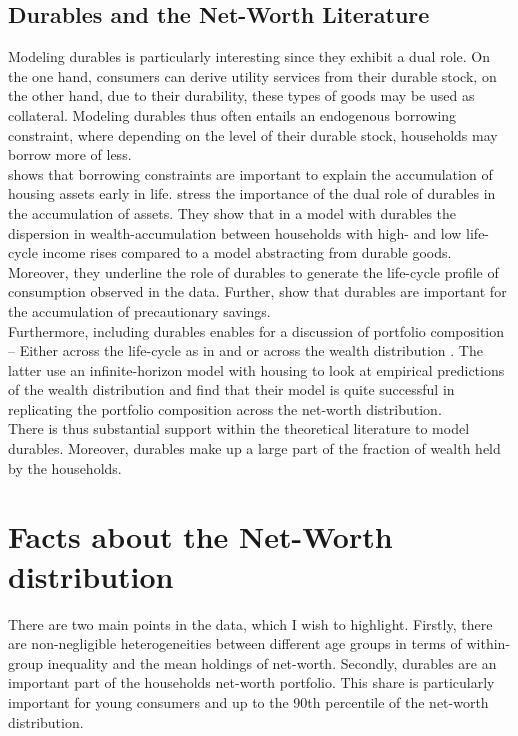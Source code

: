 \documentclass[a4paper,12pt,legno]{article}
\begin{document}
\subsection{Durables and the Net-Worth Literature}

Modeling durables is particularly interesting since they exhibit a dual role. On the one hand, consumers can derive utility services from their durable stock, on the other hand, due to their durability, these types of goods may be used as collateral. Modeling durables thus often entails an endogenous borrowing constraint, where depending on the level of their durable stock, households may borrow more of less. \\
\cite{yang2009} shows that borrowing constraints are important to explain the accumulation of housing assets early in life. \cite{FV&K2011} stress the importance of the dual role of durables in the accumulation of assets. They show that in a model with durables the dispersion in wealth-accumulation between households with high- and low life-cycle income rises compared to a model abstracting from durable goods. Moreover, they underline the role of durables to generate the life-cycle profile of consumption observed in the data. Further, \cite{gruber2003precautionary} show that durables are important for the accumulation of precautionary savings.    
\\
Furthermore, including durables enables for a discussion of portfolio composition \--- Either across the life-cycle as in \cite{yang2009} and \cite{FV&K2011} or across the wealth distribution \citep{diaz2010}. The latter use an infinite-horizon model with housing to look at empirical predictions of the wealth distribution and find that their model is quite successful in replicating the portfolio composition across the net-worth distribution.
\\
There is thus substantial support within the theoretical literature to model durables. Moreover, durables make up a large part of the fraction of wealth held by the households. 

\section{Facts about the Net-Worth distribution } There are two main points in the data, which I wish to highlight. Firstly, there are non-negligible heterogeneities between different age groups in terms of within-group inequality and the mean holdings of net-worth. Secondly, durables are an important part of the households net-worth portfolio. This share is particularly important for young consumers and up to the 90th percentile of the net-worth distribution. 
\label{facts}
\end{document}
